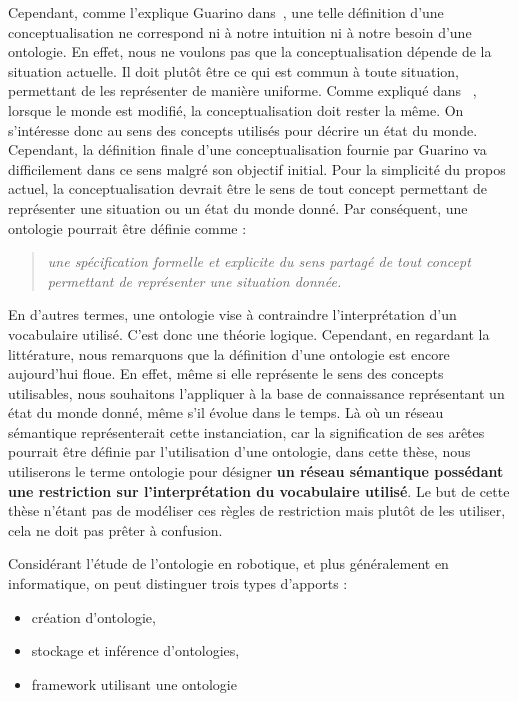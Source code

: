 Cependant, comme l'explique Guarino dans~\cite{guarino_2009_ontology}, une telle définition d'une conceptualisation ne correspond ni à notre intuition ni à notre besoin d'une ontologie. En effet, nous ne voulons pas que la conceptualisation dépende de la situation actuelle. Il doit plutôt être ce qui est commun à toute situation, permettant de les représenter de manière uniforme. Comme expliqué dans ~\cite{guarino_1995_towards}, lorsque le monde est modifié, la conceptualisation doit rester la même. On s'intéresse donc au sens des concepts utilisés pour décrire un état du monde. Cependant, la définition finale d'une conceptualisation fournie par Guarino va difficilement dans ce sens malgré son objectif initial. Pour la simplicité du propos actuel, la conceptualisation devrait être le sens de tout concept permettant de représenter une situation ou un état du monde donné. Par conséquent, une ontologie pourrait être définie comme :

\begin{quote} 
\centering 
\textit{une spécification formelle et explicite du sens partagé de tout concept permettant de représenter une situation donnée.}
\end{quote}

En d'autres termes, une ontologie vise à contraindre l'interprétation d'un vocabulaire utilisé. C'est donc une théorie logique. Cependant, en regardant la littérature, nous remarquons que la définition d'une ontologie est encore aujourd'hui floue. En effet, même si elle représente le sens des concepts utilisables, nous souhaitons l'appliquer à la base de connaissance représentant un état du monde donné, même s'il évolue dans le temps. Là où un réseau sémantique représenterait cette instanciation, car la signification de ses arêtes pourrait être définie par l'utilisation d'une ontologie, dans cette thèse, nous utiliserons le terme ontologie pour désigner \textbf{un réseau sémantique possédant une restriction sur l'interprétation du vocabulaire utilisé}. Le but de cette thèse n'étant pas de modéliser ces règles de restriction mais plutôt de les utiliser, cela ne doit pas prêter à confusion. 

Considérant l'étude de l'ontologie en robotique, et plus généralement en informatique, on peut distinguer trois types d'apports :

\begin{itemize}
   \item création d'ontologie,
   \item stockage et inférence d'ontologies,
   \item framework utilisant une ontologie
\end{itemize}

